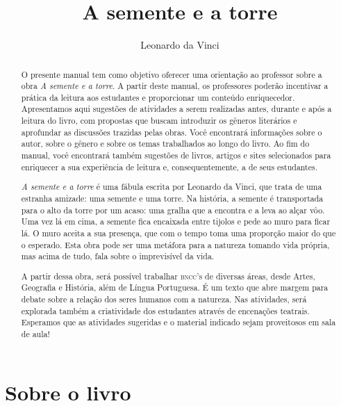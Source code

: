 \documentclass[11pt]{extarticle}
\newcommand{\AutorLivro}{Leonardo da Vinci}
\newcommand{\TituloLivro}{A semente e a torre}
\newcommand{\colaborador}{Ana Lancman}
\begin{document}
\title{\TituloLivro}
\author{\AutorLivro}
\def\authornotes{\colaborador}

\date{}
\maketitle

\tableofcontents


\begin{abstract}

O presente manual tem como objetivo oferecer uma orientação ao professor sobre a obra \textit{A semente e a torre}. A partir deste manual, os professores poderão incentivar a prática da leitura aos estudantes e proporcionar um conteúdo enriquecedor. Apresentamos aqui sugestões de atividades a serem realizadas antes, durante e após a leitura do livro, com propostas que buscam introduzir os gêneros literários e aprofundar as discussões trazidas pelas obras. Você encontrará informações sobre o autor, sobre o gênero e sobre os temas trabalhados ao longo do livro. Ao fim do manual, você encontrará também sugestões de livros, artigos e sites selecionados para enriquecer a sua experiência de leitura e, consequentemente, a de seus estudantes.

\textit{A semente e a torre} é uma fábula escrita por Leonardo da Vinci, que trata de uma estranha amizade: uma semente e uma torre. Na história, a semente é transportada para o alto da torre por um acaso: uma gralha que a encontra e a leva ao alçar vôo. Uma vez lá em cima, a semente fica encaixada entre tijolos e pede ao muro para ficar lá. O muro aceita a sua presença, que com o tempo toma uma proporção maior do que o esperado. Esta obra pode ser uma metáfora para a natureza tomando vida própria, mas acima de tudo, fala sobre o imprevisível da vida.

A partir dessa obra, será possível trabalhar \textsc{bncc}'s de diversas áreas, desde Artes, Geografia e História, além de Língua Portuguesa. É um texto que abre margem para debate sobre a relação dos seres humanos com a natureza. Nas atividades, será explorada também a criatividade dos estudantes através de encenações teatrais. Esperamos que as atividades sugeridas e o material indicado sejam proveitosos em sala de aula! 

\end{abstract}

\section{Sobre o livro}
\end{document}
